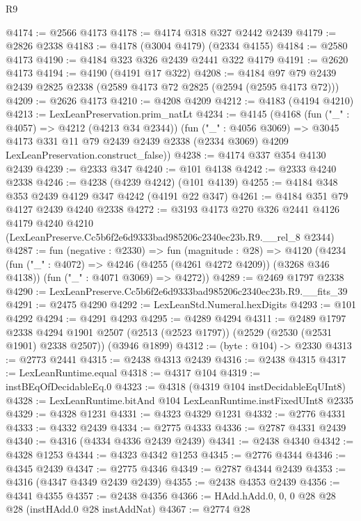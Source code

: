 \begin{lexlean}{R9}
\begin{coremodule}
@4174 := @2566 @4173
@4178 := @4174 @318 @327 @2442 @2439
@4179 := @2826 @2338
@4183 := @4178 (@3004 @4179) (@2334 @4155)
@4184 := @2580 @4173
@4190 := @4184 @323 @326 @2439 @2441 @322 @4179
@4191 := @2620 @4173
@4194 := @4190 (@4191 @17 @322)
@4208 := @4184 @97 @79 @2439 @2439 @2825 @2338 (@2589 @4173 @72 @2825 (@2594 (@2595 @4173 @72)))
@4209 := @2626 @4173
@4210 := @4208 @4209
@4212 := @4183 (@4194 @4210)
@4213 := LexLeanPreservation.prim_natLt
@4234 := @4145
    (@4168
      (fun ("_" : @4057) => @4212 (@4213 @34 @2344))
      (fun ("_" : @4056 @3069) =>
      @3045
        @4173
        @331
        @11
        @79
        @2439
        @2439
        @2338
        (@2334 @3069)
        @4209
        LexLeanPreservation.construct_false))
@4238 := @4174 @337 @354 @4130 @2439
@4239 := @2333 @347
@4240 := @101 @4138
@4242 := @2333 @4240 @2338
@4246 := @4238 (@4239 @4242) (@101 @4139)
@4255 := @4184 @348 @353 @2439 @4129 @347 @4242 (@4191 @22 @347)
@4261 := @4184 @351 @79 @4127 @2439 @4240 @2338
@4272 := @3193
    @4173
    @270
    @326
    @2441
    @4126
    @4179
    @4240
    @4210
    (LexLeanPreserve.Cc5b6f2e6d9333bad985206c2340ec23b.R9.__rel_8 @2344)
@4287 := fun (negative : @2330) =>
  fun (magnitude : @28) =>
  @4120
    (@4234
      (fun ("_" : @4072) => @4246 (@4255 (@4261 @4272 @4209)) (@3268 @346 @4138))
      (fun ("_" : @4071 @3069) => @4272))
@4289 := @2469 @1797 @2338
@4290 := LexLeanPreserve.Cc5b6f2e6d9333bad985206c2340ec23b.R9.__fits_39
@4291 := @2475 @4290
@4292 := LexLeanStd.Numeral.hexDigits
@4293 := @101 @4292
@4294 := @4291 @4293
@4295 := @4289 @4294
@4311 := @2489
    @1797
    @2338
    @4294
    @1901
    @2507
    (@2513 (@2523 @1797))
    (@2529 (@2530 (@2531 @1901) @2338 @2507))
    (@3946 @1899)
@4312 := (byte : @104) -> @2330
@4313 := @2773 @2441
@4315 := @2438 @4313 @2439
@4316 := @2438 @4315
@4317 := LexLeanRuntime.equal
@4318 := @4317 @104
@4319 := instBEqOfDecidableEq.{0}
@4323 := @4318 (@4319 @104 instDecidableEqUInt8)
@4328 := LexLeanRuntime.bitAnd @104 LexLeanRuntime.instFixedUInt8 @2335
@4329 := @4328 @1231
@4331 := @4323 @4329 @1231
@4332 := @2776 @4331
@4333 := @4332 @2439
@4334 := @2775 @4333
@4336 := @2787 @4331 @2439
@4340 := @4316 (@4334 @4336 @2439 @2439)
@4341 := @2438 @4340
@4342 := @4328 @1253
@4344 := @4323 @4342 @1253
@4345 := @2776 @4344
@4346 := @4345 @2439
@4347 := @2775 @4346
@4349 := @2787 @4344 @2439
@4353 := @4316 (@4347 @4349 @2439 @2439)
@4355 := @2438 @4353 @2439
@4356 := @4341 @4355
@4357 := @2438 @4356
@4366 := HAdd.hAdd.{0, 0, 0} @28 @28 @28 (instHAdd.{0} @28 instAddNat)
@4367 := @2774 @28

\end{coremodule}
\end{lexlean}
